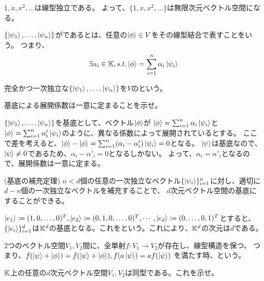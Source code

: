 \begin{reidai}
  $1,x,x^2,\ldots$は線型独立である。
  よって、$\{1,x,x^2,\ldots\}$は無限次元ベクトル空間になる。
\end{reidai}

\begin{Def}
  $\{\ket{\psi_1},\ldots,\ket{\psi_n}\}$がであるとは、任意の$\ket{\phi} \in V$をその線型結合で表すことをいう。
  つまり、
  $$
    \exists \alpha_i \in \mathbb{K}, s.t. \ket{\phi} = \sum_{i=1}^n \alpha_i \ket{\psi_i}
  $$
\end{Def}

\begin{Def}
  完全かつ一次独立な$\{\ket{\psi_1},\ldots,\ket{\psi_n}\}$を$V$のという。
\end{Def}

\begin{Mondai}
  基底による展開係数は一意に定まることを示せ。
\end{Mondai}
\sol $\{\ket{\psi_1},\ldots,\ket{\psi_n}\}$を基底として、ベクトル$\ket{\phi}$が
$\ket{\phi} = \sum_{i=1}^n \alpha_i \ket{\psi_i}$と$\ket{\phi} = \sum_{i=1}^n \alpha'_i \ket{\psi_i}$のように、異なる係数によって展開されているとする。
ここで差を考えると、$\ket{\phi} - \ket{\phi} = \sum_{i=1}^n (\alpha_i - \alpha'_i) \ket{\psi_i} = 0$となる。
$\ket{\psi}$は基底なので、$\ket{\psi} \neq 0$であるため、$\alpha_i - \alpha'_i = 0$となるしかない。
よって、$\alpha_i = \alpha'_i$となるので、展開係数は一意に定まる。

\begin{Theorem}(基底の補充定理)
  $n<d$個の任意の一次独立なベクトル$\{\ket{\psi_i}\}_{i=1}^n$に対し、適切に$d-n$個の一次独立なベクトルを補充することで、
  $d$次元ベクトル空間の基底にすることができる。
\end{Theorem}

$\ket{e_1}\coloneqq (1,0,\ldots,0)^T,\ket{e_2}\coloneqq (0,1,0,\ldots,0)^T,\cdots,\ket{e_d}\coloneqq (0,\ldots,0,1)^T$とすると、
$\{\ket{e_i}\}_{i=1}^d$は$\mathbb{K}^d$の基底となる。これをという。これにより、$\mathbb{K}^d$の次元は$d$である。

\begin{Def}
  $2$つのベクトル空間$V_1,V_2$間に、全単射$f:V_1 \to V_2$が存在し、線型構造を保つ、
  つまり、$f(\ket{\psi} + \ket{\phi}) = f(\ket{\psi} + \ket{\phi}), f(a\ket{\psi}) = af(\ket{\psi})$
  を満たす時、という。
\end{Def}

\begin{Mondai}
  $\mathbb{K}$上の任意の$d$次元ベクトル空間$V_1,V_2$は同型である。これを示せ。
\end{Mondai}


